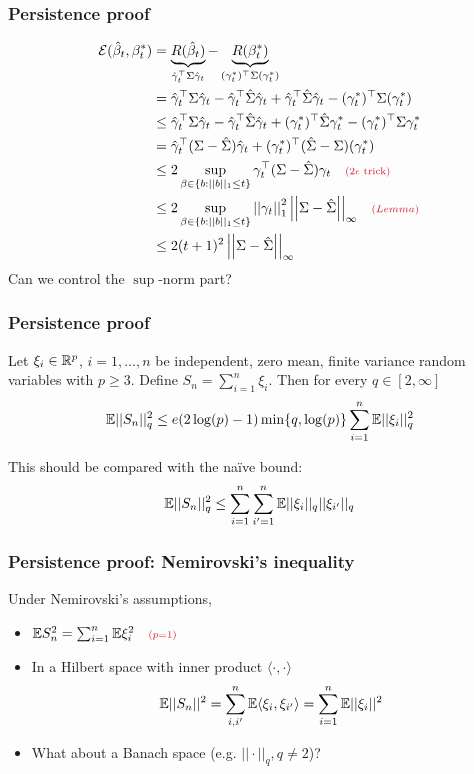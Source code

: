 \documentclass[12pt]{beamer}
\newcommand{\parenthetical}[2]{#1  \scriptstyle \alr{( #2)}}
\begin{document}
  \begin{frame}
  \frametitle{Persistence proof}
  \begin{align}
  \mathcal{E}(\hat\beta_t,\beta_t^*) 
  & = 
  \underbrace{R(\hat\beta_t)}_{ \hat\gamma_t^{\top} \Sigma \hat\gamma_t } - 
  \underbrace{R(\beta_t^*)}_{ (\gamma_t^*)^{\top} \Sigma  (\gamma_t^*)} \\
  & = 
  \hat\gamma_t^{\top} \Sigma \hat\gamma_t - \hat\gamma_t^{\top} \hat\Sigma \hat\gamma_t 
  +  \hat\gamma_t^{\top} \hat\Sigma \hat\gamma_t -  (\gamma_t^*)^{\top} \Sigma  (\gamma_t^*) \\
  & \leq
  \hat\gamma_t^{\top} \Sigma \hat\gamma_t - \hat\gamma_t^{\top} \hat\Sigma \hat\gamma_t 
  +   (\gamma_t^*)^{\top} \hat\Sigma  \gamma_t^* -  (\gamma_t^*)^{\top} \Sigma  \gamma_t^*\\  
  & =
  \hat\gamma_t^{\top} (\Sigma - \hat\Sigma) \hat\gamma_t 
  +  (\gamma_t^*)^{\top}( \hat\Sigma  - \Sigma) (\gamma_t^*) \\
  & \leq
  2\sup_{\beta \in \{b : ||b||_1 \leq t\}} \gamma_t^{\top} (\Sigma - \hat\Sigma) \gamma_t  \parenthetical{\quad}{2\epsilon \textrm{ trick}}\\
  & \leq   
  2\sup_{\beta \in \{b : ||b||_1 \leq t\}} \norm{\gamma_t}_1^2 \norm{\Sigma - \hat\Sigma}_{\infty} 
  \parenthetical{\quad}{Lemma} \\
  & \leq   
  2(t+1)^2 \norm{\Sigma - \hat\Sigma}_{\infty}   
    \end{align}
Can we control the $\sup$-norm part?
\end{frame}


  \begin{frame}
  \frametitle{Persistence proof}
  Let $\xi_i  \in \mathbb{R}^p$, $i=1,\ldots,n$ be independent, zero mean, finite variance
random variables with $p \geq 3$.  Define $S_n = \sum_{i=1}^n \xi_i$. 
Then for every $q \in [2,\infty]$
\[
\mathbb{E} ||S_n ||_q^2 \leq e(2\log(p)-1) \min\{q, \log(p)\} \sum_{i=1}^n \mathbb{E} ||\xi_i||_q^2
\]

\vsp

This should be compared with the na\"ive bound:
\[
\mathbb{E} ||S_n ||_q^2 \leq \sum_{i=1}^n\sum_{i'=1}^n \mathbb{E} ||\xi_i||_q||\xi_{i'}||_q
\]
\end{frame}
  \begin{frame}
  \frametitle{Persistence proof: Nemirovski's inequality}

 Under Nemirovski's assumptions, 
\begin{itemize}
\item $\E S_n^2 = \sum_{i=1}^n \E\xi_i^2 \parenthetical{\quad}{p=1}$
\item In a Hilbert space with inner product $\langle \cdot, \cdot \rangle$
\[
\mathbb{E} ||S_n||^2 = \sum_{i,i'}^n \mathbb{E} \langle \xi_i, \xi_{i'} \rangle = \sum_{i=1}^n \mathbb{E} ||\xi_i||^2
\]
\item What about a Banach space (e.g. $||\cdot||_q, q \neq 2$)?
\end{itemize}
\end{frame}
\end{document}
